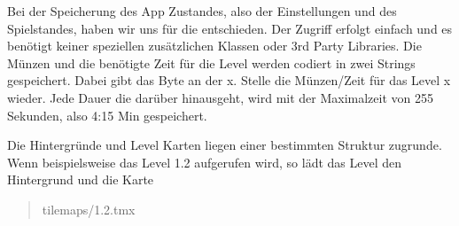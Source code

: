 \label{sec:3_Speichersystem}

Bei der Speicherung des App Zustandes, also der Einstellungen und des Spielstandes, haben wir uns für die  entschieden. Der Zugriff erfolgt einfach und es benötigt keiner speziellen zusätzlichen Klassen oder 3rd Party Libraries. Die Münzen und die benötigte Zeit für die Level werden codiert in zwei Strings gespeichert. Dabei gibt das Byte an der x. Stelle die Münzen/Zeit für das Level x wieder. Jede Dauer die darüber hinausgeht, wird mit der Maximalzeit von 255 Sekunden, also 4:15 Min gespeichert.

Die Hintergründe und Level Karten liegen einer bestimmten Struktur zugrunde. Wenn beispielsweise das Level 1.2 aufgerufen wird, so lädt das Level den Hintergrund  und die Karte \blockquote{tilemaps/1.2.tmx}.

